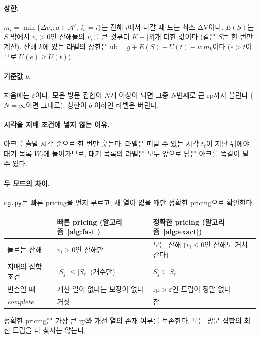 \documentclass[10pt]{article}
\newcommand{\ub}{\mathrm{ub}}
\newcommand{\rp}{\mathrm{rp}}
\begin{document}
\paragraph{상한.}
$m_i=\min\{\Delta v_a: a\in\mathcal{A}',\ i_a=i\}$는 잔해 $i$에서 나갈 때 드는 최소 ΔV이다.
$E(S)$는 $S$ 밖에서 $v_i>0$인 잔해들의 $v_i$를 큰 것부터 $K-|S|$개 더한 값이다 (같은 $S$는 한 번만 계산).
잔해 $k$에 있는 라벨의 상한은 $\ub=g+E(S)-U(t)-w\,m_k$이다 ($\bar e>t$이므로 $U(\bar e)\ge U(t)$).

\paragraph{기준값 $b$.}
처음에는 $\varepsilon$이다. 모은 방문 집합이 $N$개 이상이 되면 그중 $N$번째로 큰 rp까지 올린다
($N=\infty$이면 그대로).
상한이 $b$ 이하인 라벨은 버린다.

\paragraph{시각을 지배 조건에 넣지 않는 이유.}
아크를 출발 시각 순으로 한 번만 훑는다.
라벨은 떠날 수 있는 시각 $t_\ell$이 지난 뒤에야 대기 목록 $W_j$에 들어가므로,
대기 목록의 라벨은 모두 앞으로 남은 아크를 똑같이 탈 수 있다.

\paragraph{두 모드의 차이.}
\texttt{cg.py}는 빠른 pricing을 먼저 부르고, 새 열이 없을 때만 정확한 pricing으로 확인한다.
\begin{center}
\begin{tabular}{lll}
\toprule
 & 빠른 pricing (알고리즘~\ref{alg:fast}) & 정확한 pricing (알고리즘~\ref{alg:exact}) \\
\midrule
들르는 잔해 & $v_i>0$인 잔해만 & 모든 잔해 ($v_i\le 0$인 잔해도 거쳐 간다) \\
지배의 집합 조건 & $|S_f|\le|S_\ell|$ (개수만) & $S_f\subseteq S_\ell$ \\
빈손일 때 & 개선 열이 없다는 보장이 없다 & $\rp>\varepsilon$인 트립이 정말 없다 \\
\textit{complete} & 거짓 & 참 \\
\bottomrule
\end{tabular}
\end{center}
정확한 pricing은 가장 큰 rp와 개선 열의 존재 여부를 보존한다.
모든 방문 집합의 최선 트립을 다 찾지는 않는다.
\end{document}
